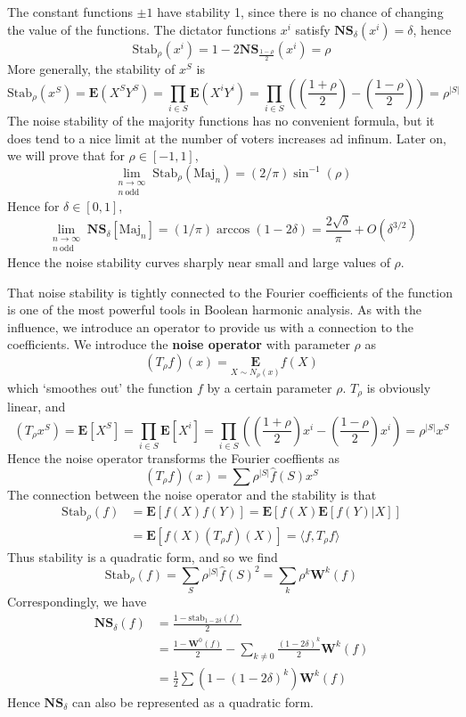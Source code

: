 \begin{example}
    The constant functions $\pm 1$ have stability 1, since there is no chance of changing the value of the functions. The dictator functions $x^i$ satisfy $\mathbf{NS}_\delta(x^i) = \delta$, hence
    \[ \text{Stab}_\rho(x^i) = 1 - 2 \mathbf{NS}_{\frac{1 - \rho}{2}}(x^i) = \rho \]
    More generally, the stability of $x^S$ is
    \[ \text{Stab}_\rho(x^S) = \mathbf{E}(X^SY^S) = \prod_{i \in S} \mathbf{E}(X^iY^i) = \prod_{i \in S} \left( \left( \frac{1 + \rho}{2} \right) - \left( \frac{1 - \rho}{2} \right) \right) = \rho^{|S|} \]
    The noise stability of the majority functions has no convenient formula, but it does tend to a nice limit at the number of voters increases ad infinum. Later on, we will prove that for $\rho \in [-1,1]$,
    \[ \lim_{\substack{n \to \infty\\n\ \text{odd}}} \text{Stab}_\rho(\text{Maj}_n) = (2/\pi) \sin^{-1}(\rho) \]
    Hence for $\delta \in [0,1]$,
    \[ \lim_{\substack{n \to \infty\\n\ \text{odd}}} \mathbf{NS}_\delta[\text{Maj}_n] = (1/\pi) \arccos(1 - 2 \delta) = \frac{2\sqrt{\delta}}{\pi} + O(\delta^{3/2}) \]
    Hence the noise stability curves sharply near small and large values of $\rho$.
\end{example}

That noise stability is tightly connected to the Fourier coefficients of the function is one of the most powerful tools in Boolean harmonic analysis. As with the influence, we introduce an operator to provide us with a connection to the coefficients. We introduce the {\bf noise operator} with parameter $\rho$ as
%
\[ (T_\rho f)(x) = \underset{X \sim N_\rho(x)}{\mathbf{E}} f(X) \]
%
which `smoothes out' the function $f$ by a certain parameter $\rho$. $T_\rho$ is obviously linear, and
%
\[ (T_\rho x^S) = \mathbf{E}[X^S] = \prod_{i \in S} \mathbf{E}[X^i] = \prod_{i \in S} \left( \left( \frac{1 + \rho}{2} \right) x^i - \left( \frac{1 - \rho}{2} \right) x^i \right) = \rho^{|S|} x^S \]
%
Hence the noise operator transforms the Fourier coeffients as
%
\[ (T_\rho f)(x) = \sum \rho^{|S|} \widehat{f}(S) x^S \]
%
The connection between the noise operator and the stability is that
%
\begin{align*}
    \text{Stab}_\rho(f) &= \mathbf{E}[f(X)f(Y)] = \mathbf{E}[f(X)\mathbf{E}[f(Y) | X]]\\
    &= \mathbf{E}[f(X) (T_\rho f)(X)] = \langle f, T_\rho f \rangle
\end{align*}
%
Thus stability is a quadratic form, and so we find
%
\[ \text{Stab}_\rho(f) = \sum_S \rho^{|S|} \widehat{f}(S)^2 = \sum_k \rho^k \mathbf{W}^k(f) \]
%
Correspondingly, we have
%
\begin{align*}
    \mathbf{NS}_\delta(f) &= \frac{1 - \text{stab}_{1 - 2\delta}(f)}{2}\\
    &= \frac{1 - \mathbf{W}^0(f)}{2} - \sum_{k \neq 0} \frac{(1 - 2\delta)^k}{2} \mathbf{W}^k(f)\\
    &= \frac{1}{2} \sum (1 - (1 - 2\delta)^k) \mathbf{W}^k(f)
\end{align*}
%
Hence $\mathbf{NS}_\delta$ can also be represented as a quadratic form.

